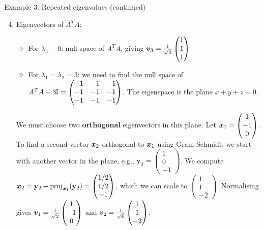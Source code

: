 \documentclass[aspectratio=169]{beamer}\usepackage[]{graphicx}\usepackage[]{xcolor}
\begin{document}
\begin{frame}{Example 3: Repeated eigenvalues (continued)}
\begin{enumerate}
\setcounter{enumi}{3}
\item Eigenvectors of $A^TA$:
\begin{itemize}
\item For $\lambda_3=0$: null space of $A^TA$, giving $\bm{v}_3 = \frac{1}{\sqrt{3}}\begin{pmatrix} 1 \\ 1 \\ 1 \end{pmatrix}$
\item For $\lambda_1=\lambda_2=3$: we need to find the null space of $A^TA - 3\mathbb{I} = \begin{pmatrix} -1 & -1 & -1 \\ -1 & -1 & -1 \\ -1 & -1 & -1 \end{pmatrix}$. The eigenspace is the plane $x+y+z=0$. 
\end{itemize}
We must choose two \textbf{orthogonal} eigenvectors in this plane. 
\vfill
Let $\bm{x}_1 = \begin{pmatrix} 1 \\ -1 \\ 0 \end{pmatrix}$. To find a second vector $\bm{x}_2$ orthogonal to $\bm{x}_1$ using Gram-Schmidt, we start with another vector in the plane, e.g., $\mathbf{y}_2 = \begin{pmatrix} 1 \\ 0 \\ -1 \end{pmatrix}$. We compute $\bm{x}_2 = \mathbf{y}_2 - \mathrm{proj}_{\bm{x}_1}(\mathbf{y}_2) = \begin{pmatrix} 1/2 \\ 1/2 \\ -1 \end{pmatrix}$, which we can scale to $\begin{pmatrix} 1 \\ 1 \\ -2 \end{pmatrix}$.
\vfill
Normalising gives $\bm{v}_1 = \frac{1}{\sqrt{2}}\begin{pmatrix} 1 \\ -1 \\ 0 \end{pmatrix}$ and $\bm{v}_2 = \frac{1}{\sqrt{6}}\begin{pmatrix} 1 \\ 1 \\ -2 \end{pmatrix}$.
\end{enumerate}
\end{frame}
\end{document}
